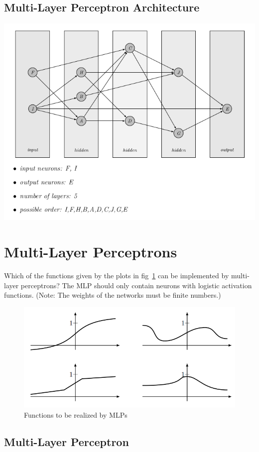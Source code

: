 \documentclass[12pt]{article}
\begin{document}
\subsection{Multi-Layer Perceptron Architecture}

{
	\centering
	\includegraphics[width=.9\textwidth]{fig/2018-04-02-14-57-10.png}
}

\section{Multi-Layer Perceptrons}

Which of the functions given by the plots in fig~\ref{fig:mlp3} can be implemented by multi-layer
perceptrons? The MLP should only contain neurons with logistic activation functions.
(Note: The weights of the networks must be finite numbers.)

\begin{figure}
	\centering

	\includegraphics[width=.75\textwidth]{fig/2018-03-19-13-57-32.png}
	\caption{Functions to be realized by MLPs} \label{fig:mlp3}
\end{figure}

\subsection{Multi-Layer Perceptron}
\end{document}
